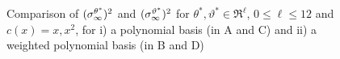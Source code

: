 \begin{figure}[htbp]
	\centering
	\mbox{
	 \quad
	}

	\mbox{
	 \quad 
	}
	\caption{Comparison of $(\sigma_\infty^{\theta^*})^2$ and $(\sigma_\infty^{\vartheta^*})^2$ for $\theta^*, \vartheta^* \in \Re^{\ell}$, $0 \leq \ell \leq 12$ and $c(x) = x, x^2$, for i) a polynomial basis (in A and C) and ii) a weighted polynomial basis (in B and D)}
	\label{fig:mcmc_var_vs_asym_var}
\end{figure}
